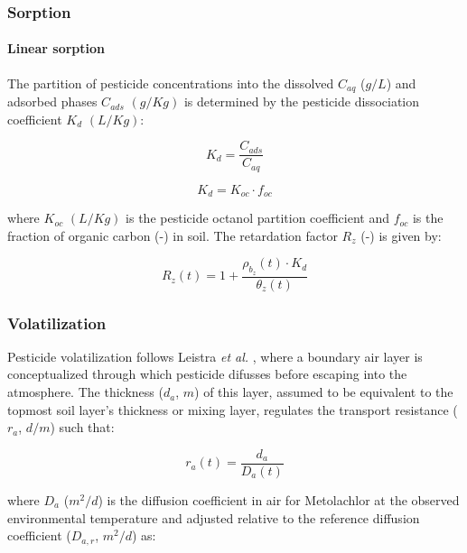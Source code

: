 \documentclass[]{article}
\let\oldparagraph\paragraph
\renewcommand{\paragraph}[1]{\oldparagraph{#1}\mbox{}}
\begin{document}
\subsubsection{Sorption}\label{sorption}

\paragraph{Linear sorption}\label{linear-sorption}

The partition of pesticide concentrations into the dissolved \(C_{aq}\)
(\(g/L\)) and adsorbed phases \(C_{ads}\) \((g/Kg)\) is determined by
the pesticide dissociation coefficient \(K_d\) \((L/Kg)\):

\begin{equation}
K_d = \frac{ C_{ads} }{ C_{aq}  }
\label{eq:kd}
\end{equation}

\begin{equation}
K_d = K_{oc} \cdot f_{oc}
\label{eq:kd}
\end{equation}

where \(K_{oc}\) \((L/Kg)\) is the pesticide octanol partition
coefficient and \(f_{oc}\) is the fraction of organic carbon (-) in
soil. The retardation factor \(R_z\) (-) is given by:

\begin{equation}
R_z(t) = 1 + \frac{ \rho_{b_z}(t) \cdot K_d }{ \theta_z(t) }
\label{eq:retard_linear}
\end{equation}

\subsubsection{Volatilization}\label{volatilization}

Pesticide volatilization follows Leistra \textit{et al.}
\citeyearpar{Leistra2001}, where a boundary air layer is conceptualized
through which pesticide difusses before escaping into the atmosphere.
The thickness (\(d_a\), \(m\)) of this layer, assumed to be equivalent
to the topmost soil layer's thickness or mixing layer, regulates the
transport resistance (\(r_a\), \(d/m\)) such that:

\begin{equation}
r_a(t) = \frac{ d_a }{ D_a(t) }
\label{eq:resistance_air}
\end{equation}

where \(D_a\) (\(m^2/d\)) is the diffusion coefficient in air for
Metolachlor at the observed environmental temperature and adjusted
relative to the reference diffusion coefficient (\(D_{a,r}\), \(m^2/d\))
as:
\end{document}
